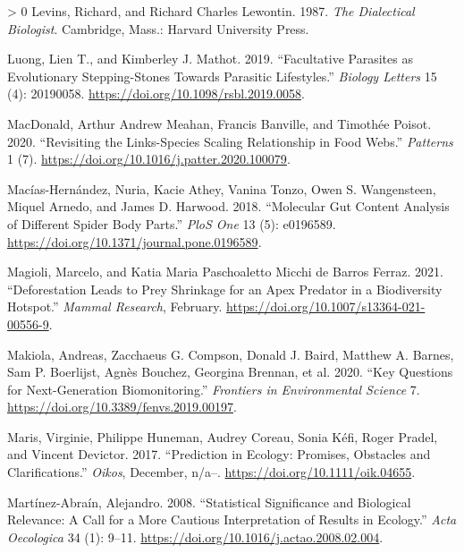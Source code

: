 \documentclass[11pt]{article}
\newlength{\cslhangindent}
\newenvironment{CSLReferences}[3] %
 {%
  \setlength{\parindent}{0pt}
  \ifodd #1 \everypar{\setlength{\hangindent}{\cslhangindent}}\ignorespaces\fi
  \ifnum #2 > 0
  \setlength{\parskip}{#2\baselineskip}
  \fi
 }%
 {}
\begin{document}
\begin{CSLReferences}{1}{0}
\leavevmode\hypertarget{ref-Levins1987DiaBio}{}%
Levins, Richard, and Richard Charles Lewontin. 1987. \emph{The
Dialectical Biologist}. Cambridge, Mass.: Harvard University Press.

\leavevmode\hypertarget{ref-Luong2019FacPar}{}%
Luong, Lien T., and Kimberley J. Mathot. 2019. {``Facultative Parasites
as Evolutionary Stepping-Stones Towards Parasitic Lifestyles.''}
\emph{Biology Letters} 15 (4): 20190058.
\url{https://doi.org/10.1098/rsbl.2019.0058}.

\leavevmode\hypertarget{ref-MacDonald2020RevLin}{}%
MacDonald, Arthur Andrew Meahan, Francis Banville, and Timothée Poisot.
2020. {``Revisiting the Links-Species Scaling Relationship in Food
Webs.''} \emph{Patterns} 1 (7).
\url{https://doi.org/10.1016/j.patter.2020.100079}.

\leavevmode\hypertarget{ref-Macias-Hernandez2018MolGut}{}%
Macías-Hernández, Nuria, Kacie Athey, Vanina Tonzo, Owen S. Wangensteen,
Miquel Arnedo, and James D. Harwood. 2018. {``Molecular Gut Content
Analysis of Different Spider Body Parts.''} \emph{PloS One} 13 (5):
e0196589. \url{https://doi.org/10.1371/journal.pone.0196589}.

\leavevmode\hypertarget{ref-Magioli2021DefLea}{}%
Magioli, Marcelo, and Katia Maria Paschoaletto Micchi de Barros Ferraz.
2021. {``Deforestation Leads to Prey Shrinkage for an Apex Predator in a
Biodiversity Hotspot.''} \emph{Mammal Research}, February.
\url{https://doi.org/10.1007/s13364-021-00556-9}.

\leavevmode\hypertarget{ref-Makiola2020KeyQue}{}%
Makiola, Andreas, Zacchaeus G. Compson, Donald J. Baird, Matthew A.
Barnes, Sam P. Boerlijst, Agnès Bouchez, Georgina Brennan, et al. 2020.
{``Key Questions for Next-Generation Biomonitoring.''} \emph{Frontiers
in Environmental Science} 7.
\url{https://doi.org/10.3389/fenvs.2019.00197}.

\leavevmode\hypertarget{ref-Maris2017PreEco}{}%
Maris, Virginie, Philippe Huneman, Audrey Coreau, Sonia Kéfi, Roger
Pradel, and Vincent Devictor. 2017. {``Prediction in Ecology: Promises,
Obstacles and Clarifications.''} \emph{Oikos}, December, n/a--.
\url{https://doi.org/10.1111/oik.04655}.

\leavevmode\hypertarget{ref-Martinez-Abrain2008StaSig}{}%
Martínez-Abraín, Alejandro. 2008. {``Statistical Significance and
Biological Relevance: A Call for a More Cautious Interpretation of
Results in Ecology.''} \emph{Acta Oecologica} 34 (1): 9--11.
\url{https://doi.org/10.1016/j.actao.2008.02.004}.


\end{CSLReferences}
\end{document}
